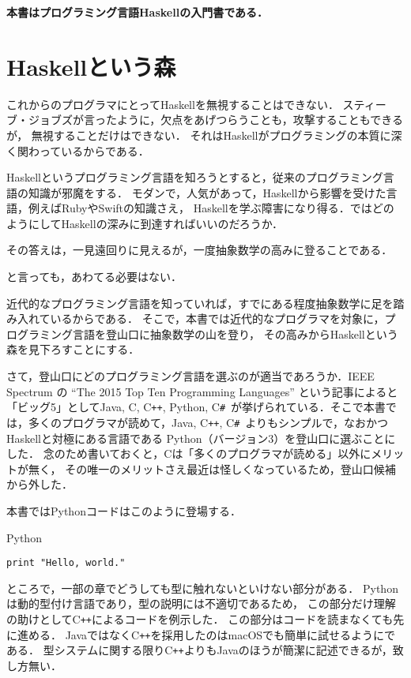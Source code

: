 \documentclass[a5paper,draft]{jsbook}
\newcommand{\programminglanguage}[1]{\textsf{#1}}
\newcommand{\clang}{\programminglanguage{C}}
\newcommand{\csharp}{\programminglanguage{C}\texttt{\#}}
\newcommand{\cxx}{\programminglanguage{C}\texttt{++}}
\newcommand{\haskell}{\programminglanguage{Haskell}}
\newcommand{\java}{\programminglanguage{Java}}
\newcommand{\python}{\programminglanguage{Python}}
\newcommand{\ruby}{\programminglanguage{Ruby}}
\newcommand{\swift}{\programminglanguage{Swift}}
\newenvironment{leader}{\begingroup\bf}{\endgroup}
\newenvironment{pythoncode}{\begin{itembox}[r]{\python}}{\end{itembox}}
\begin{document}
\begin{leader}
本書はプログラミング言語\haskell の入門書である．
\end{leader}

\section{\haskell という森}

これからのプログラマにとって\haskell を無視することはできない．
スティーブ・ジョブズが言ったように，欠点をあげつらうことも，攻撃することもできるが，
無視することだけはできない．
それは\haskell がプログラミングの本質に深く関わっているからである．

\haskell というプログラミング言語を知ろうとすると，従来のプログラミング言語の知識が邪魔をする．
モダンで，人気があって，\haskell から影響を受けた言語，例えば\ruby や\swift の知識さえ，
\haskell を学ぶ障害になり得る．ではどのようにして\haskell の深みに到達すればいいのだろうか．

その答えは，一見遠回りに見えるが，一度抽象数学の高みに登ることである．

と言っても，あわてる必要はない．

近代的なプログラミング言語を知っていれば，すでにある程度抽象数学に足を踏み入れているからである．
そこで，本書では近代的なプログラマを対象に，プログラミング言語を登山口に抽象数学の山を登り，
その高みから\haskell という森を見下ろすことにする．

さて，登山口にどのプログラミング言語を選ぶのが適当であろうか．IEEE Spectrum の ``The 2015
Top Ten Programming Languages'' という記事によると「ビッグ5」として\java, \clang,
\cxx, \python, \csharp\ が挙げられている．そこで本書では，多くのプログラマが読めて，\java,
\cxx, \csharp\ よりもシンプルで，なおかつ\haskell と対極にある言語である
\python（バージョン3）を登山口に選ぶことにした．
念のため書いておくと，\clang は「多くのプログラマが読める」以外にメリットが無く，
その唯一のメリットさえ最近は怪しくなっているため，登山口候補から外した．

本書では\python コードはこのように登場する．
\begin{pythoncode}
\begin{verbatim}
print "Hello, world."
\end{verbatim}
\end{pythoncode}

ところで，一部の章でどうしても型に触れないといけない部分がある．
\python は動的型付け言語であり，型の説明には不適切であるため，
この部分だけ理解の助けとして\cxx によるコードを例示した．
この部分はコードを読まなくても先に進める．
\java ではなく\cxx を採用したのはmacOSでも簡単に試せるようにである．
型システムに関する限り\cxx よりも\java のほうが簡潔に記述できるが，致し方無い．
\end{document}
